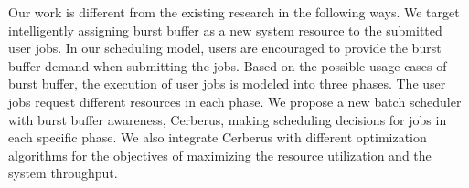 Our work is different from the existing research in the following ways.
We target intelligently assigning burst buffer as a new system resource to the submitted user jobs.
In our scheduling model, users are encouraged to provide the burst buffer demand when submitting the jobs.
Based on the possible usage cases of burst buffer, the execution of user jobs is modeled into three phases.
The user jobs request different resources in each phase.
We propose a new batch scheduler with burst buffer awareness, Cerberus,
making scheduling decisions for jobs in each specific phase.
We also integrate Cerberus with different optimization algorithms for the
objectives of maximizing the resource utilization and the system throughput.




